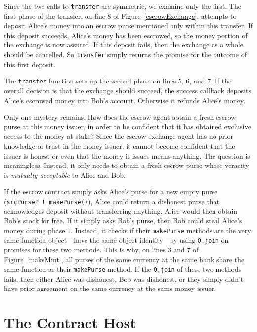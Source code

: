 \documentclass{llncs}
\begin{document}
Since the two calls to {\tt transfer} are symmetric, we examine only the first. The first phase of the transfer, on line 8 of Figure~\ref{escrowExchange}, attempts to deposit Alice's money into an escrow purse mentioned only within this transfer. If this deposit succeeds, Alice's money has been escrowed, so the money portion of the exchange is now assured. If this deposit fails, then the exchange as a whole should be cancelled. So {\tt transfer} simply returns the promise for the outcome of this first deposit.

The {\tt transfer} function sets up the second phase on lines 5, 6, and 7. If the overall decision is that the exchange should succeed,  the success callback deposits Alice's escrowed money into Bob's account. Otherwise it refunds Alice's money.

Only one mystery remains. How does the escrow agent obtain a fresh escrow purse at this money issuer, in order to be confident that it has obtained exclusive access to the money at stake? Since the escrow exchange agent has no prior knowledge or trust in the money issuer, it cannot become confident that the issuer is honest or even that the money it issues means anything. The question is meaningless. Instead, it only needs to obtain a fresh escrow purse whose veracity is \emph{mutually acceptable} to Alice and Bob.

If the escrow contract simply asks Alice's purse for a new empty purse ({\tt srcPurseP~!~makePurse()}), Alice could return a dishonest purse that acknowledges deposit without transferring anything. Alice would then obtain Bob's stock for free. If it simply asks Bob's purse, then Bob could steal Alice's money during phase 1. Instead, it checks if their {\tt makePurse} methods are the very same function object---have the same object identity---by using {\tt Q.join} on promises for these two methods. This is why, on lines 3 and 7 of Figure~\ref{makeMint}, all purses of the same currency at the same bank share the same function as their {\tt makePurse} method. If the {\tt Q.join} of these two methods fails, then either Alice was dishonest, Bob was dishonest, or they simply didn't have prior agreement on the same currency at the same money issuer.

\section{The Contract Host}
\label{contracthost}
\end{document}
